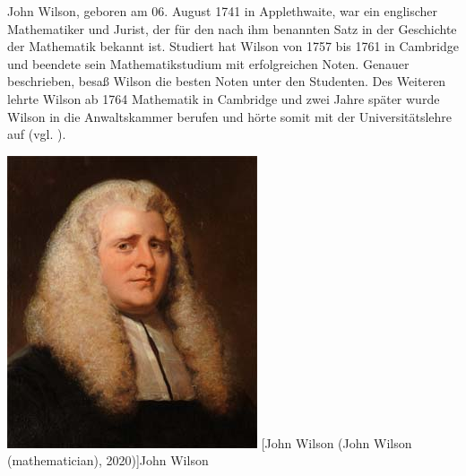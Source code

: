 \begin{minipage}{0.65\linewidth}
John Wilson, geboren am 06. August 1741 in Applethwaite,
war ein englischer Mathematiker und Jurist, der für den
nach ihm benannten Satz in der Geschichte der Mathematik
bekannt ist. Studiert hat Wilson von 1757 bis 1761 in
Cambridge und beendete sein Mathematikstudium mit
erfolgreichen Noten. Genauer beschrieben, besaß Wilson
die besten Noten unter den Studenten. Des Weiteren
lehrte Wilson ab 1764 Mathematik in Cambridge und zwei
Jahre später wurde Wilson in die Anwaltskammer berufen
und hörte somit mit der Universitätslehre auf
(vgl. \cite{oconnor_wilson}).
\end{minipage}
\hfil
\begin{minipage}[r]{0.3\linewidth}
  \captionsetup{type=figure,font=small,skip=6pt,format=plain}%
  \capstart
  \includegraphics[width=1.0\linewidth]{./images/john_wilson.jpeg}
  [John Wilson (John Wilson (mathematician), 2020)]{John Wilson}
  \label{fig:portrait_wilson}
\end{minipage}
\vspace{.3cm}


